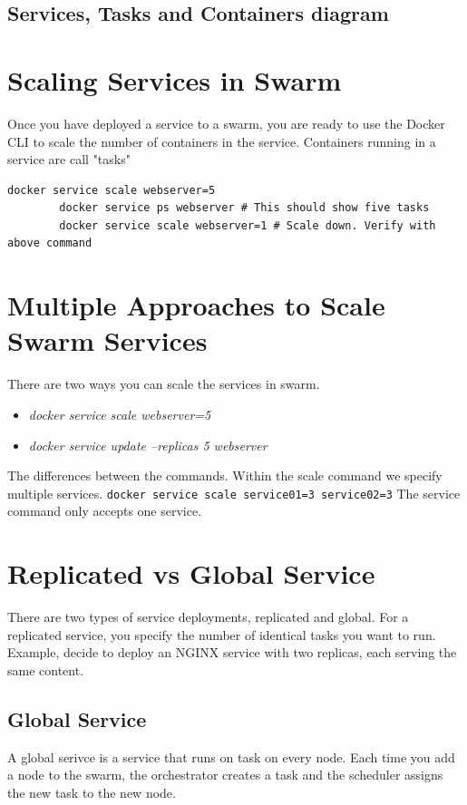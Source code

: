 \documentclass[11pt]{book}
\begin{document}
    \subsection{Services, Tasks and Containers diagram}
    
    \section{Scaling Services in Swarm}
    Once you have deployed a service to a swarm, you are ready to use the Docker CLI to scale the number of containers in the service.
    Containers running in a service are call "tasks"

    \begin{lstlisting}[style=terminal]
        docker service scale webserver=5
        docker service ps webserver # This should show five tasks
        docker service scale webserver=1 # Scale down. Verify with above command
    \end{lstlisting}
    
    \section{Multiple Approaches to Scale Swarm Services}
    There are two ways you can scale the services in swarm.
    \begin{itemize}
        \item \textit{docker service scale webserver=5}
        \item \textit{docker service update --replicas 5 webserver}
    \end{itemize}

    The differences between the commands.
    Within the scale command we specify multiple services. \texttt{docker service scale service01=3 service02=3}
    The service command only accepts one service.

    \section{Replicated vs Global Service}
    There are two types of service deployments, replicated and global.
    For a replicated service, you specify the number of identical tasks you want to run.
    Example, decide to deploy an NGINX service with two replicas, each serving the same content.

    \subsection{Global Service}
    A global serivce is a service that runs on task on every node.
    Each time you add a node to the swarm, the orchestrator creates a task and the scheduler assigns the new task to the new node.
\end{document}
